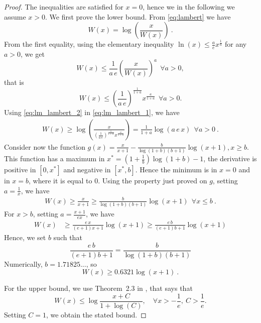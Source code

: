 \begin{proof}
The inequalities are satisfied for $x=0$, hence we in the following we assume $x>0$.
We first prove the lower bound. From \eqref{eq:lambert} we have
\begin{equation}
W(x) = \log\left(\frac{x}{W(x)}\right)~. \label{eq:lm_lambert_1}
\end{equation}
From the first equality, using the elementary inequality $\ln (x) \leq \frac{a}{e} x^\frac{1}{a}$ for any $a>0$, we get
\[
W(x) \leq \frac{1}{a\, e}\left(\frac{x}{W(x)}\right)^a  \ \ \forall a>0,
\]
that is
\begin{equation}
\label{eq:lm_lambert_2}
W(x) \leq \left(\frac{1}{a\, e}\right)^\frac{1}{1+a} x^\frac{a}{1+a} \ \ \forall a>0.
\end{equation}
Using \eqref{eq:lm_lambert_2} in \eqref{eq:lm_lambert_1}, we have
\begin{align*}
W(x)
\geq \log\left(\frac{x}{\left(\frac{1}{a\, e}\right)^\frac{1}{1+a} x^\frac{a}{1+a}}\right)
= \frac{1}{1+a}\log\left(a \, e\, x\right) \ \ \forall a>0~.
\end{align*}
Consider now the function $g(x)=\frac{x}{x+1} - \frac{b}{\log(1+b) (b+1)}
\log(x+1), x\geq b$. This function has a maximum in $x^*=(1+\frac{1}{b})
\log(1+b)-1$, the derivative is positive in $[0,x^*]$ and negative in
$[x^*,b]$. Hence the minimum is in $x=0$ and in $x=b$, where it is equal to
$0$.  Using the property just proved on $g$, setting $a=\frac{1}{x}$, we have
\begin{align*}
W(x)
\geq \frac{x}{x+1} \geq \frac{b}{\log(1+b) (b+1)} \log(x+1) \ \  \forall x\leq b~.
\end{align*}
For $x>b$, setting $a=\frac{x+1}{e x}$, we have
\begin{align}
W(x)
&\geq \frac{e\,x}{(e+1) x + 1} \log(x+1) \geq \frac{e\,b}{(e+1) b + 1} \log(x+1)
\end{align}
Hence, we set $b$ such that
\[
\frac{e\, b}{(e+1)b + 1} = \frac{b}{\log(1+b) (b+1)}
\]
Numerically, $b=1.71825...$, so
\[
W(x) \geq 0.6321 \log(x+1)~.
\]

For the upper bound, we use Theorem~2.3 in \cite{hoorfar2008inequalities}, that says that
\[
W(x) \leq \log\frac{x+C}{1+\log(C)}, \quad \forall x> -\frac{1}{e}, \ C>\frac{1}{e}.
\]
Setting $C=1$, we obtain the stated bound.
\end{proof}

